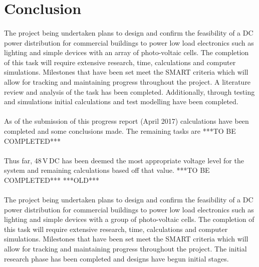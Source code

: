 \section{Conclusion}

\paragraph{}
The project being undertaken plans to design and confirm the feasibility of a DC power distribution for commercial buildings to power low load electronics such as lighting and simple devices with an array of photo-voltaic cells. The completion of this task will require extensive research, time, calculations and computer simulations. Milestones that have been set meet the SMART criteria which will allow for tracking and maintaining progress throughout the project. A literature review and analysis of the task has been completed. Additionally, through testing and simulations initial calculations and test modelling have been completed. 

\paragraph{}
As of the submission of this progress report (April 2017) calculations have been completed and some conclusions made. The remaining tasks are 
\newline
***TO BE COMPLETED***

\paragraph{}
Thus far, 48\,V\,DC has been deemed the most appropriate voltage level for the system and remaining calculations based off that value. 
\newline
***TO BE COMPLETED***
\newline
***OLD***
\paragraph{}
The project being undertaken plans to design and confirm the feasibility of a DC power distribution for commercial buildings to power low load electronics such as lighting and simple devices with a group of photo-voltaic cells. The completion of this task will require extensive research, time, calculations and computer simulations. Milestones that have been set meet the SMART criteria which will allow for tracking and maintaining progress throughout the project. The initial research phase has been completed and designs have begun initial stages.

